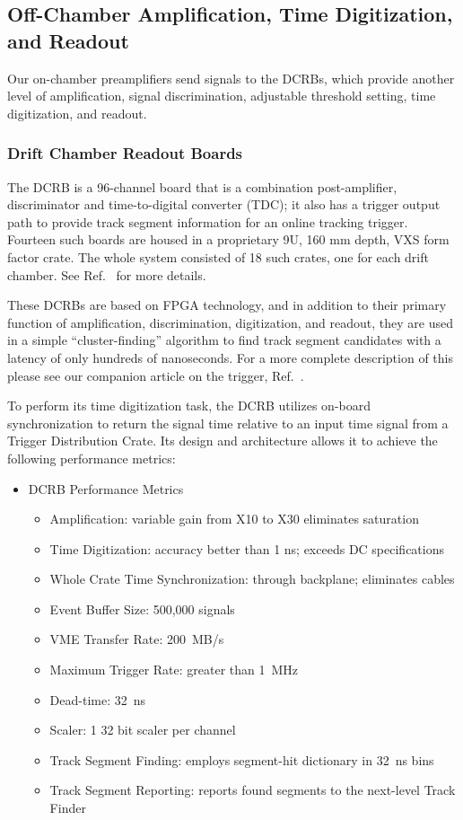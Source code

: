 \subsection{Off-Chamber Amplification, Time Digitization, and Readout}

Our on-chamber preamplifiers send signals to the DCRBs, which provide another level of amplification, 
signal discrimination, adjustable threshold setting, time digitization, and readout. 



\subsubsection{Drift Chamber Readout Boards}

The DCRB is a 96-channel board that is a combination post-amplifier,
discriminator and time-to-digital converter (TDC); it also has a trigger
output path to provide track segment information for an online tracking trigger.
Fourteen such boards are housed in
a proprietary 9U, 160 mm depth, VXS form factor crate.
The whole system consisted of 18 such crates, one for each drift chamber.
See Ref.~\cite{daq-nim} for more details.

These DCRBs are based on FPGA technology, and in addition to
their primary function of amplification, discrimination, digitization,
and readout, they are used in a simple ``cluster-finding'' algorithm
to find track segment candidates with a latency of only hundreds
of nanoseconds.  For a more complete description of this please
see our companion article on the trigger, Ref.~\cite{trigger-nim}.

To perform its time digitization task, the DCRB utilizes on-board synchronization to
return the signal time relative to an input time signal from  a Trigger Distribution
Crate. Its design and architecture
allows it to achieve the following performance metrics:
\begin{itemize}
\item DCRB Performance Metrics
\begin{itemize}
\item Amplification: variable gain from X10 to X30 eliminates saturation
\item Time Digitization: accuracy better than 1 ns; exceeds DC specifications
\item Whole Crate Time Synchronization: through backplane; eliminates cables
\item Event Buffer Size: 500,000 signals
\item VME Transfer Rate: 200~MB/s
\item Maximum Trigger Rate: greater than 1~MHz
\item Dead-time: 32~ns
\item Scaler: 1 32 bit scaler per channel
\item Track Segment Finding: employs segment-hit dictionary in 32~ns bins
\item Track Segment Reporting: reports found segments to the next-level Track Finder
\end{itemize}
\end{itemize}

